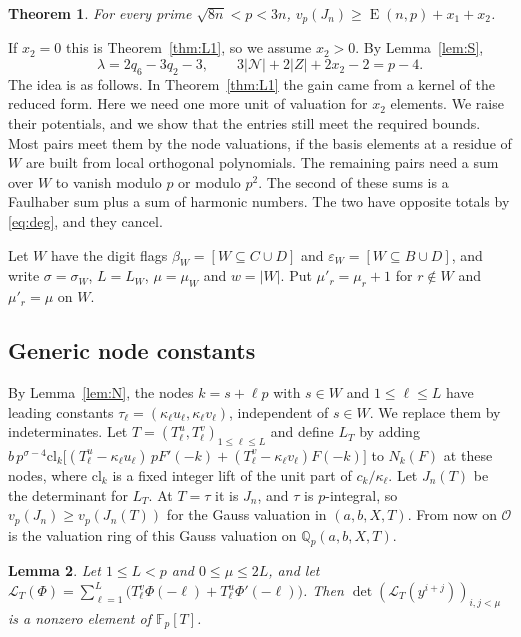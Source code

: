 \documentclass[11pt]{amsart}
\newtheorem{theorem}{Theorem}[section]
\newtheorem{lemma}[theorem]{Lemma}
\theoremstyle{definition}
\theoremstyle{remark}
\numberwithin{equation}{section}
\newcommand{\Q}{\mathbb Q}
\newcommand{\F}{\mathbb F}
\newcommand{\cL}{\mathcal L}
\newcommand{\cO}{\mathcal O}
\newcommand{\Lex}{\operatorname{E}}
\begin{document}
\begin{theorem}\label{thm:L2}
For every prime $\sqrt{8n}<p<3n$, $v_p(J_n)\ge\Lex(n,p)+x_1+x_2$.
\end{theorem}

If $x_2=0$ this is Theorem~\ref{thm:L1}, so we assume $x_2>0$. By Lemma~\ref{lem:S},
\begin{equation}\label{eq:deg}
 \lambda=2q_6-3q_2-3,\qquad 3|\mathcal N|+2|Z|+2x_2-2=p-4 .
\end{equation}
The idea is as follows. In Theorem~\ref{thm:L1} the gain came from a kernel of the reduced form. Here we need one more
unit of valuation for $x_2$ elements. We raise their potentials, and we show that the entries still meet the
required bounds. Most pairs meet them by the node valuations, if the basis elements at a residue of $W$ are built
from local orthogonal polynomials. The remaining pairs need a sum over $W$ to vanish modulo $p$ or modulo $p^2$. The
second of these sums is a Faulhaber sum plus a sum of harmonic numbers. The two have opposite totals by
\eqref{eq:deg}, and they cancel.

Let $W$ have the digit flags $\beta_W=[W\subseteq C\cup D]$ and $\varepsilon_W=[W\subseteq B\cup D]$, and write
$\sigma=\sigma_W$, $L=L_W$, $\mu=\mu_W$ and $w=|W|$. Put $\mu'_r=\mu_r+1$ for $r\notin W$ and $\mu'_r=\mu$ on $W$.

\subsection{Generic node constants}
By Lemma~\ref{lem:N}, the nodes $k=s+\ell p$ with $s\in W$ and $1\le\ell\le L$ have leading constants
$\tau_\ell=(\kappa_\ell u_\ell,\kappa_\ell v_\ell)$, independent of $s\in W$. We replace them by indeterminates. Let
$T=(T^u_\ell,T^v_\ell)_{1\le\ell\le L}$ and define $L_T$ by adding
$b\,p^{\sigma-4}\mathrm{cl}_k\bigl[(T^u_\ell-\kappa_\ell u_\ell)\,pF'(-k)+(T^v_\ell-\kappa_\ell v_\ell)F(-k)\bigr]$ to $N_k(F)$
at these nodes, where $\mathrm{cl}_k$ is a fixed integer lift of the unit part of $c_k/\kappa_\ell$. Let $J_n(T)$ be the
determinant for $L_T$. At $T=\tau$ it is $J_n$, and $\tau$ is $p$-integral, so $v_p(J_n)\ge v_p(J_n(T))$ for the Gauss
valuation in $(a,b,X,T)$. From now on $\cO$ is the valuation ring of this Gauss valuation on $\Q_p(a,b,X,T)$.

\begin{lemma}\label{lem:H}
Let $1\le L<p$ and $0\le\mu\le2L$, and let $\cL_T(\Phi)=\sum_{\ell=1}^L\bigl(T^v_\ell\Phi(-\ell)+T^u_\ell\Phi'(-\ell)\bigr)$.
Then $\det(\cL_T(y^{i+j}))_{i,j<\mu}$ is a nonzero element of $\F_p[T]$.
\end{lemma}
\end{document}
